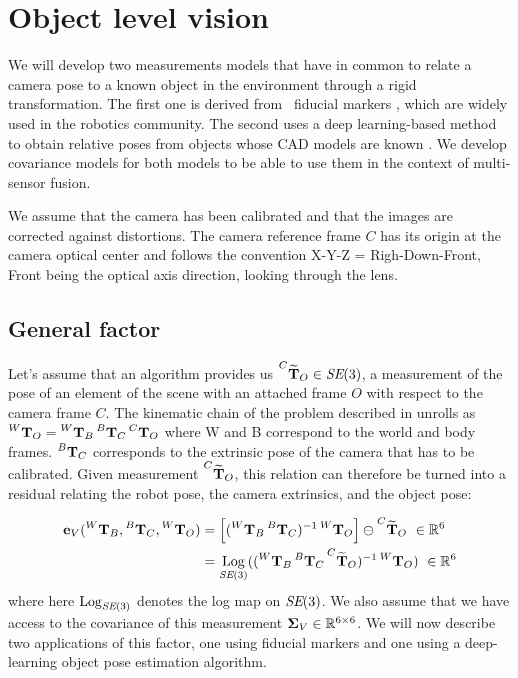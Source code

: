 \chapter{Object level vision}
\label{chp:object_level}
\minitoc

We will develop two measurements models that have in common to relate a camera pose to a known object in the environment through a rigid transformation. The first one 
is derived from \apriltag\ fiducial markers \cite{wang2016iros}, which are widely used in the robotics community. The second uses a deep learning-based method
to obtain relative poses from objects whose CAD models are known \cite{labbe2020cosypose}. We develop covariance models for both
models to be able to use them in the context of multi-sensor fusion.

We assume that the camera has been calibrated and that the images are corrected against distortions. The camera reference frame $C$ has its origin at 
the camera optical center and follows the convention X-Y-Z = Righ-Down-Front, Front being the optical axis direction, looking through the lens.

\section{General factor}
Let's assume that an algorithm provides us $\prescript{C}{}{\widetilde{{\bf T}}}_{O} \in \textit{SE}(3)$, a measurement of the pose of an element 
of the scene with an attached frame $O$ with respect to the camera frame $C$.
The kinematic chain of the problem described in  unrolls as 
$\prescript{W}{}{{\bf T}}_{O} = \prescript{W}{}{{\bf T}}_{B}\prescript{B}{}{{\bf T}}_{C}\prescript{C}{}{{\bf T}}_{O}$ where W and B correspond to the world and body frames. $\prescript{B}{}{{\bf T}}_{C}$ corresponds to the extrinsic pose 
of the camera that has to be calibrated.
Given measurement $\prescript{C}{}{\widetilde{{\bf T}}}_{O}$, this relation can therefore be turned into a residual relating 
the robot pose, the camera extrinsics, and the object pose:

\begin{align}
    {\bf e}_V (\prescript{W}{}{{\bf T}}_{B}, \prescript{B}{}{{\bf T}}_{C}, \prescript{W}{}{{\bf T}}_{O}) 
    &= \left[ (\prescript{W}{}{{\bf T}}_{B}\prescript{B}{}{{\bf T}}_{C})^{-1}\prescript{W}{}{{\bf T}}_{O} \right] \ominus \prescript{C}{}{\widetilde{{\bf T}}}_{O} ~ \in \mathbb{R}^6 \\
    &= \operatorname*{Log}_{\textit{SE}(3)} ( (\prescript{W}{}{{\bf T}}_{B} \prescript{B}{}{{\bf T}}_{C} \prescript{C}{}{\widetilde{{\bf T}}}_{O})^{-1} \prescript{W}{}{{\bf T}}_{O}) ~ \in \mathbb{R}^6
\end{align}
%
where here $\operatorname*{Log}_{\textit{SE}(3)}$ denotes the log map on $\textit{SE}(3)$.
We also assume that we have access to the covariance of this measurement 
\mbox{${\bm \Sigma}_V \in \mathbb{R}^{6 \times 6}$}. We will now describe two applications of this factor, one using \apriltag fiducial markers and one using 
a deep-learning object pose estimation algorithm.

